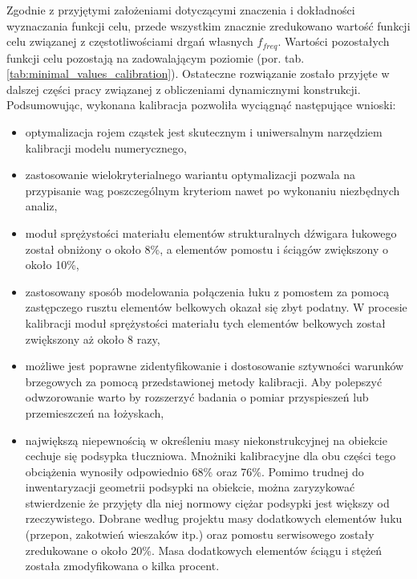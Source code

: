 Zgodnie z przyjętymi założeniami dotyczącymi znaczenia i dokładności wyznaczania funkcji celu, przede wszystkim znacznie zredukowano wartość funkcji celu związanej z częstotliwościami drgań własnych $f_{freq}$. Wartości pozostałych funkcji celu pozostają na zadowalającym poziomie (por. tab. \ref{tab:minimal_values_calibration}). Ostateczne rozwiązanie zostało przyjęte w dalszej części pracy związanej z obliczeniami dynamicznymi konstrukcji. Podsumowując, wykonana kalibracja pozwoliła wyciągnąć następujące wnioski:
\begin{itemize}
	\item optymalizacja rojem cząstek jest skutecznym i uniwersalnym narzędziem kalibracji modelu numerycznego,
	\item zastosowanie wielokryterialnego wariantu optymalizacji pozwala na przypisanie wag poszczególnym kryteriom nawet po wykonaniu niezbędnych analiz,
	\item moduł sprężystości materiału elementów strukturalnych dźwigara łukowego został obniżony o około 8\%, a elementów pomostu i ściągów zwiększony o około 10\%,
	\item zastosowany sposób modelowania połączenia łuku z pomostem za pomocą zastępczego rusztu elementów belkowych okazał się zbyt podatny. W procesie kalibracji moduł sprężystości materiału tych elementów belkowych został zwiększony aż około 8 razy,
	\item możliwe jest poprawne zidentyfikowanie i dostosowanie sztywności warunków brzegowych za pomocą przedstawionej metody kalibracji. Aby polepszyć odwzorowanie warto by rozszerzyć badania o pomiar przyspieszeń lub przemieszczeń na łożyskach,
	\item największą niepewnością w określeniu masy niekonstrukcyjnej na obiekcie cechuje się podsypka tłuczniowa. Mnożniki kalibracyjne dla obu części tego obciążenia wynosiły odpowiednio 68\% oraz 76\%. Pomimo trudnej do inwentaryzacji geometrii podsypki na obiekcie, można zaryzykować stwierdzenie że przyjęty dla niej normowy ciężar podsypki jest większy od rzeczywistego. Dobrane według projektu masy dodatkowych elementów łuku (przepon, zakotwień wieszaków itp.) oraz pomostu serwisowego zostały zredukowane o około 20\%. Masa dodatkowych elementów ściągu i stężeń została zmodyfikowana o kilka procent.
\end{itemize}


